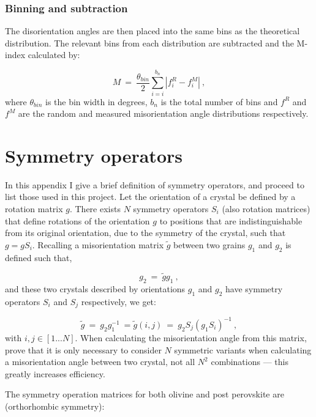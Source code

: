 \documentclass[a4paper,12pt,twoside]{report}
\numberwithin{equation}{chapter}
\begin{document}
\subsubsection{Binning and subtraction}
The disorientation angles are then placed into the same bins as the theoretical distribution. The relevant bins from each distribution are subtracted and the M-index calculated by:

\begin{equation}
M\ =\ \frac{\theta_{bin}}{2} \sum_{i=i}^{b_n} | f_i^R - f_i^M |\ ,  
\end{equation}
\noindent
where $\theta_{bin}$ is the bin width in degrees, $b_n$ is the total number of bins and $f^R$ and $f^M$ are the random and measured misorientation angle distributions respectively.

\section{Symmetry operators} \label{App:symp_ops}
In this appendix I give a brief definition of symmetry operators, and proceed to list those used in this project. Let the orientation of a crystal be defined by a rotation matrix $g$. There exists $N$ symmetry operators $S_i$ (also rotation matrices) that define rotations of the orientation $g$ to positions that are indistinguishable from its original orientation, due to the symmetry of the crystal, such that $g = gS_i$. Recalling a misorientation matrix $\tilde{g}$ between two grains $g_1$ and $g_2$ is defined such that,

\begin{equation}
g_2\ =\ \tilde{g}g_1\ ,
\end{equation} 
\noindent
and these two crystals described by orientations $g_1$ and $g_2$ have symmetry operators $S_i$ and $S_j$ respectively, we get:

\begin{equation} \label{App:eq:misorientation}
\tilde{g}\ =\ g_2g_1^{-1}\ = \tilde{g}(i,j)\ =\ g_2S_j(g_1S_i)^{-1}\ ,  
\end{equation}
\noindent
with $i,j \in [1...N]$. When calculating the misorientation angle from this matrix, \cite{Wheeler2001} prove that it is only necessary to consider $N$ symmetric variants when calculating a misorientation angle between two crystal, not all $N^2$ combinations --- this greatly increases efficiency.

The symmetry operation matrices for both olivine and post perovskite are (orthorhombic symmetry):
\end{document}
